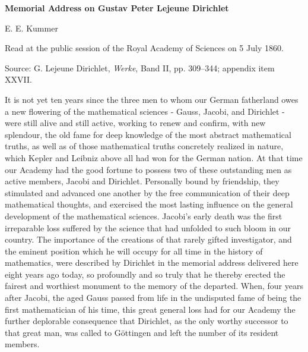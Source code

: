 \documentclass[11pt]{article}
\begin{document}
\begin{center}
{\Large\bfseries Memorial Address on Gustav Peter Lejeune Dirichlet\par}
\vspace{0.35em}
{\large E. E. Kummer\par}
\vspace{0.35em}
{\small Read at the public session of the Royal Academy of Sciences on 5 July 1860.}\par
\vspace{0.4em}
{\small Source: G. Lejeune Dirichlet, \emph{Werke}, Band II, pp. 309--344; appendix item XXVII.}\par
\vspace{1.2em}
\end{center}
It is not yet ten years since the three men to whom our German fatherland owes a new flowering of the mathematical sciences - Gauss, Jacobi, and Dirichlet - were still alive and still active, working to renew and confirm, with new splendour, the old fame for deep knowledge of the most abstract mathematical truths, as well as of those mathematical truths concretely realized in nature, which Kepler and Leibniz above all had won for the German nation. At that time our Academy had the good fortune to possess two of these outstanding men as active members, Jacobi and Dirichlet. Personally bound by friendship, they stimulated and advanced one another by the free communication of their deep mathematical thoughts, and exercised the most lasting influence on the general development of the mathematical sciences. Jacobi's early death was the first irreparable loss suffered by the science that had unfolded to such bloom in our country. The importance of the creations of that rarely gifted investigator, and the eminent position which he will occupy for all time in the history of mathematics, were described by Dirichlet in the memorial address delivered here eight years ago today, so profoundly and so truly that he thereby erected the fairest and worthiest monument to the memory of the departed. When, four years after Jacobi, the aged Gauss passed from life in the undisputed fame of being the first mathematician of his time, this great general loss had for our Academy the further deplorable consequence that Dirichlet, as the only worthy successor to that great man, was called to Göttingen and left the number of its resident members.
\end{document}
